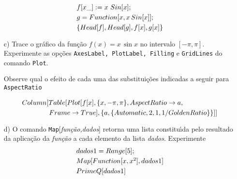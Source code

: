 \documentclass[11pt]{article}
\begin{document}
\begin{itemize}
\[\begin{array}{l}
   \\ 
f[x\_]:= x\ Sin[x];  

 \vspace{1mm}
  
   \\ 
 g=Function[x,x\, Sin[x]]; 
 
   \vspace{1mm}
  
   \\ 
 \{Head[f], Head[g], f[x], g[x]\}
\end{array} \]




\item[c)]  Trace o gr\'afico da fun\c{c}\~ao $f(x) = x \,\sin x$ no intervalo $[-\pi,\pi]$.  Experimente as op\c{c}\~oes \texttt{AxesLabel, PlotLabel, Filling} e \texttt{GridLines}  do comando \texttt{Plot}. 
  
  Observe qual o efeito de cada uma das substitui\c{c}\~oes indicadas a seguir para \texttt{AspectRatio}

 \[\begin{array}{l}
Column[Table[
  Plot[f[x], \{x, -\pi, \pi\}, AspectRatio \rightarrow a, 
  
  \vspace{1mm}
  
   \\ 
\qquad \qquad    Frame \rightarrow True], \{a, \{Automatic, 2, 1, 1/GoldenRatio\}\}]]
\end{array} \]


    
\pagebreak

 \item[d)]   O comando \texttt{Map}[\textsl{fun\c{c}\~ao,dados}]  retorna uma lista constitu\'\i da  pelo resultado da aplica\c{c}\~ao da \textsl{fun\c{c}\~ao}  a cada elemento da lista \textsl{dados}. Experimente
 \[\begin{array}{l}


dados1=Range[5];

        \vspace{1mm}
\\


Map[Function[x,x^2],dados1]
 
         \vspace{1mm}
\\

PrimeQ[dados1]

         \vspace{1mm}
\\



\end{array}\]
\end{itemize}
\end{document}
